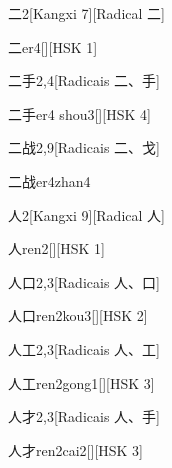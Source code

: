 \begin{entry}{二}{2}[Kangxi 7][Radical ⼆]
  \begin{phonetics}{二}{er4}[][HSK 1]
  \end{phonetics}
\end{entry}

\begin{entry}{二手}{2,4}[Radicais ⼆、⼿]
  \begin{phonetics}{二手}{er4 shou3}[][HSK 4]
  \end{phonetics}
\end{entry}

\begin{entry}{二战}{2,9}[Radicais ⼆、⼽]
  \begin{phonetics}{二战}{er4zhan4}
  \end{phonetics}
\end{entry}

\begin{entry}{人}{2}[Kangxi 9][Radical ⼈]
  \begin{phonetics}{人}{ren2}[][HSK 1]
  \end{phonetics}
\end{entry}

\begin{entry}{人口}{2,3}[Radicais ⼈、⼝]
  \begin{phonetics}{人口}{ren2kou3}[][HSK 2]
  \end{phonetics}
\end{entry}

\begin{entry}{人工}{2,3}[Radicais ⼈、⼯]
  \begin{phonetics}{人工}{ren2gong1}[][HSK 3]
  \end{phonetics}
\end{entry}

\begin{entry}{人才}{2,3}[Radicais ⼈、⼿]
  \begin{phonetics}{人才}{ren2cai2}[][HSK 3]
  \end{phonetics}
\end{entry}

